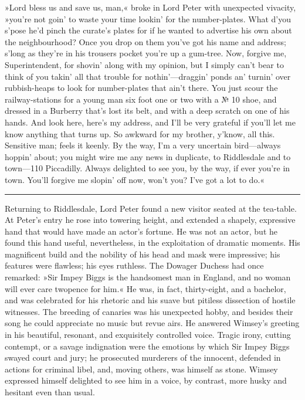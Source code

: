 »Lord bless us and save us, man,« broke in Lord Peter with unexpected vivacity, »you're not goin' to waste your time lookin' for the number-plates. What d'you s'pose he'd pinch the curate's plates for if he wanted to advertise his own about the neighbourhood? Once you drop on them you've got his name and address; s'long as they're in his trousers pocket you're up a gum-tree. Now, forgive me, Superintendent, for shovin' along with my opinion, but I simply can't bear to think of you takin' all that trouble for nothin'—draggin' ponds an' turnin' over rubbish-heaps to look for number-plates that ain't there. You just scour the railway-stations for a young man six foot one or two with a № 10 shoe, and dressed in a Burberry that's lost its belt, and with a deep scratch on one of his hands. And look here, here's my address, and I'll be very grateful if you'll let me know anything that turns up. So awkward for my brother, y'know, all this. Sensitive man; feels it keenly. By the way, I'm a very uncertain bird—always hoppin' about; you might wire me any news in duplicate, to Riddlesdale and to town—110 Piccadilly. Always delighted to see you, by the way, if ever you're in town. You'll forgive me slopin' off now, won't you? I've got a lot to do.«

\noindent\hfil\rule{0.5\textwidth}{.4pt}\hfil

Returning to Riddlesdale, Lord Peter found a new visitor seated at the tea-table. At Peter's entry he rose into towering height, and extended a shapely, expressive hand that would have made an actor's fortune.  He was not an actor, but he found this hand useful, nevertheless, in the exploitation of dramatic moments. His magnificent build and the nobility of his head and mask were impressive; his features were flawless; his eyes ruthless. The Dowager Duchess had once remarked: »Sir Impey Biggs is the handsomest man in England, and no woman will ever care twopence for him.« He was, in fact, thirty-eight, and a bachelor, and was celebrated for his rhetoric and his suave but pitiless dissection of hostile witnesses. The breeding of canaries was his unexpected hobby, and besides their song he could appreciate no music but revue airs. He answered Wimsey's greeting in his beautiful, resonant, and exquisitely controlled voice. Tragic irony, cutting contempt, or a savage indignation were the emotions by which Sir Impey Biggs swayed court and jury; he prosecuted murderers of the innocent, defended in actions for criminal libel, and, moving others, was himself as stone. Wimsey expressed himself delighted to see him in a voice, by contrast, more husky and hesitant even than usual.


